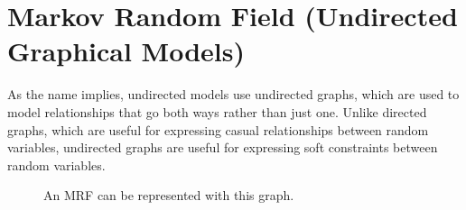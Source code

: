\documentclass{article}
\begin{document}
\section{Markov Random Field (Undirected Graphical Models)}

  As the name implies, undirected models use undirected graphs, which are used to model relationships that go both ways rather than just one. Unlike directed graphs, which are useful for expressing casual relationships between random variables, undirected graphs are useful for expressing soft constraints between random variables.  

  \begin{figure}[H]
    \centering 
    \caption{An MRF can be represented with this graph.} 
    \label{fig:mrf_graph}
  \end{figure}
\end{document}
